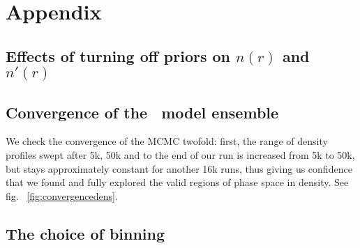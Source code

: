 \section{Appendix}
\appendix
\subsection{Effects of turning off priors on $n(r)$ and $n'(r)$}



\subsection{Convergence of the \MultiNest\ model ensemble}
We check the convergence of the MCMC twofold: first, the range of density
profiles swept after 5k, 50k and to the end of our run is increased from 5k to
50k, but stays approximately constant for another 16k runs, thus giving us
confidence that we found and fully explored the valid regions of phase space in
density. See fig. ~\ref{fig:convergencedens}.

\begin{figure*}
    \begin{center}
        \hspace{-7mm}
        \caption{ of the density profile after
          (3k,30k,300k) iterations (left to right) for Gaia01.}
        \label{fig:convergencedens}
    \end{center}
\end{figure*}

%
%

\subsection{The choice of binning}

